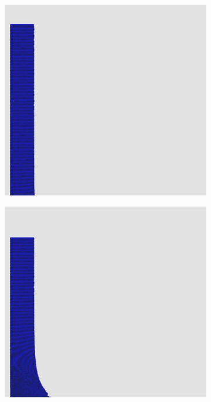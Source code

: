 \documentclass[12pt,a4paper,dvipsnames]{article}
\begin{document}
\begin{figure}[!ht] \centering
	\begin{subfigure}[!h]{0.3\textwidth} \centering
		\includegraphics[width=\textwidth]{VDB/VDB-01.jpg}
	\end{subfigure}
    \begin{subfigure}[!h]{0.3\textwidth} \centering
		\includegraphics[width=\textwidth]{VDB/VDB-02.jpg}

\end{subfigure}
\end{figure}
\end{document}
